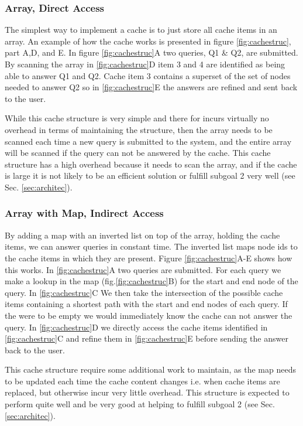 \subsubsection{Array, Direct Access}

The simplest way to implement a cache is to just store all cache items in an array. An example of how the cache works is presented in  figure \ref{fig:cachestruc}, part A,D, and E. In figure \ref{fig:cachestruc}A two \spath queries, Q1 \& Q2, are submitted. By scanning the array in \ref{fig:cachestruc}D item 3 and 4 are identified as being able to answer Q1 and Q2. Cache item 3 contains a superset of the set of nodes needed to answer Q2 so in \ref{fig:cachestruc}E the answers are refined and sent back to the user.

While this cache structure is very simple and there for incurs virtually no overhead in terms of maintaining the structure, then the array needs to be scanned each time a new query is submitted to the system, and the entire array will be scanned if the query can not be answered by the cache. This cache structure has a high overhead because it needs to scan the array, and if the cache is large it is not likely to be an efficient solution or fulfill subgoal 2 very well (see Sec. \ref{sec:architec}).


\subsubsection{Array with Map, Indirect Access}
By adding a map with an inverted list on top of the array, holding the cache items, we can answer queries in constant time. The inverted list maps node ids to the cache items in which they are present. Figure \ref{fig:cachestruc}A-E shows how this works. In \ref{fig:cachestruc}A two queries are submitted. For each query we make a lookup in the map (fig.\ref{fig:cachestruc}B) for the start and end node of the query. In \ref{fig:cachestruc}C We then take the intersection of the possible cache items containing a shortest path with the start and end nodes of each query. If the were to be empty we would immediately know the cache can not answer the query. In \ref{fig:cachestruc}D we directly access the cache items identified in \ref{fig:cachestruc}C and refine them in \ref{fig:cachestruc}E before sending the answer back to the user.

This cache structure require some additional work to maintain, as the map needs to be updated each time the cache content changes i.e. when cache items are replaced, but otherwise incur very little overhead. This structure is expected to perform quite well and be very good at helping to fulfill subgoal 2 (see Sec. \ref{sec:architec}).

